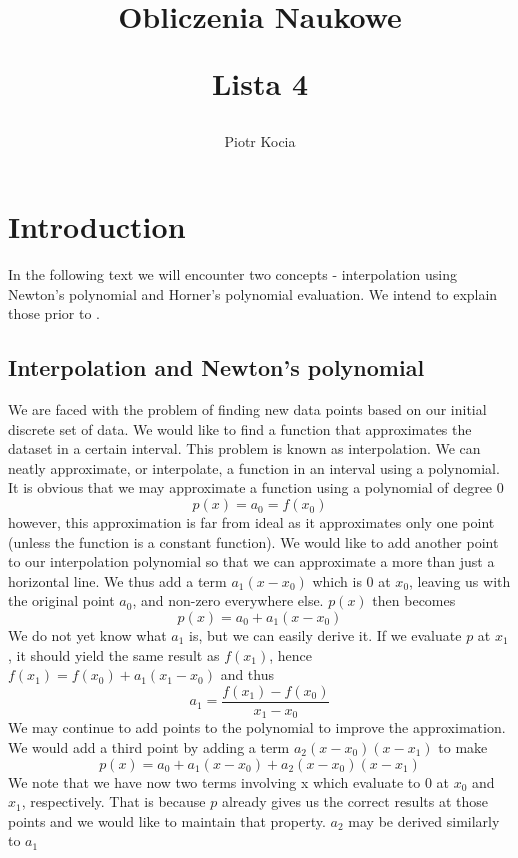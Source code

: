 \documentclass[12pt, a4paper]{article}
\title{
  Obliczenia Naukowe\\
  \begin{center}\Large Lista 4\end{center}
}
\author{Piotr Kocia}
\begin{document}
\maketitle

\tableofcontents

\section{Introduction}
In the following text we will encounter two concepts - interpolation using
Newton's polynomial and Horner's polynomial evaluation. We intend to explain
those prior to .

\subsection{Interpolation and Newton's polynomial}
We are faced with the problem of finding new data points based on our initial
discrete set of data. We would like to find a function that approximates the
dataset in a certain interval. This problem is known as interpolation. We can
neatly approximate, or interpolate, a function in an interval using a
polynomial. It is obvious that we may approximate a function using a polynomial
of degree 0
$$
p(x) = a_0 = f(x_0)
$$
however, this approximation is far from ideal as it approximates only one point
(unless the function is a constant function). We would like to add another point
to our interpolation polynomial so that we can approximate a more than just a
horizontal line. We thus add a term $a_1(x - x_0)$ which is 0 at $x_0$, leaving
us with the original point $a_0$, and non-zero everywhere else. $p(x)$ then
becomes
$$
p(x) = a_0 + a_1(x - x_0)
$$
We do not yet know what $a_1$ is, but we can easily derive it. If we evaluate $p$
at $x_1$, it should yield the same result as $f(x_1)$, hence $f(x_1) = f(x_0) +
a_1(x_1 - x_0)$ and thus
$$
a_1 = \frac{f(x_1) - f(x_0)}{x_1 - x_0}
$$
We may continue to add points to the polynomial to improve the approximation. We
would add a third point by adding a term $a_2(x - x_0)(x - x_1)$ to make
$$
p(x) = a_0 + a_1(x - x_0) + a_2(x - x_0)(x - x_1)
$$
We note that we have now two terms involving x which evaluate to 0 at $x_0$ and
$x_1$, respectively. That is because $p$ already gives us the correct results at
those points and we would like to maintain that property. $a_2$ may be derived
similarly to $a_1$
\end{document}
